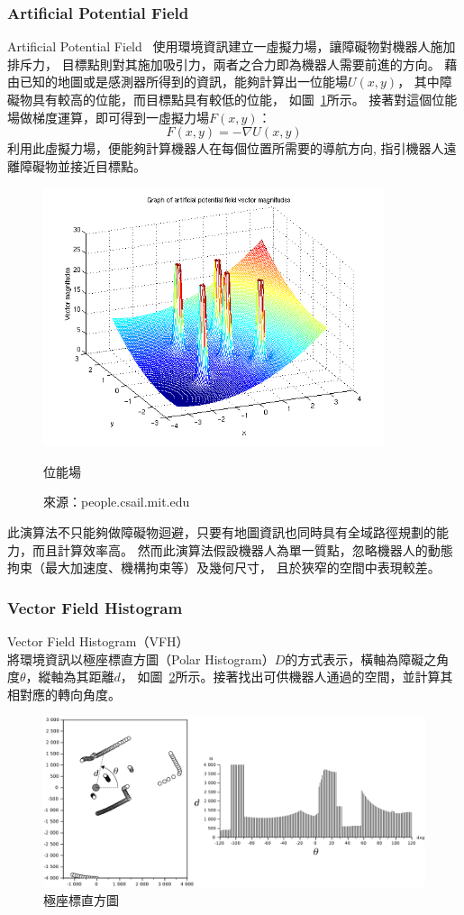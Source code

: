 \subsubsection{Artificial Potential Field}
Artificial Potential Field~\cite{Khatib:1985:APF}
使用環境資訊建立一虛擬力場，讓障礙物對機器人施加排斥力，
目標點則對其施加吸引力，兩者之合力即為機器人需要前進的方向。
藉由已知的地圖或是感測器所得到的資訊，能夠計算出一位能場$U(x,y)$，
其中障礙物具有較高的位能，而目標點具有較低的位能，
如圖~\ref{f:potential_field}所示。
接著對這個位能場做梯度運算，即可得到一虛擬力場$F(x,y)$：
\begin{equation}
	F(x,y) = -\nabla U(x,y)
\end{equation}
利用此虛擬力場，便能夠計算機器人在每個位置所需要的導航方向, 
指引機器人遠離障礙物並接近目標點。
\begin{figure}[h!]
	\centering
	\includegraphics[width=10cm]{figures/demo_apf_whitebg}
	\caption{位能場}
	\caption*{來源：people.csail.mit.edu}
	\label{f:potential_field}
\end{figure}

此演算法不只能夠做障礙物迴避，只要有地圖資訊也同時具有全域路徑規劃的能力，而且計算效率高。
然而此演算法假設機器人為單一質點，忽略機器人的動態拘束（最大加速度、機構拘束等）及幾何尺寸，
且於狹窄的空間中表現較差。

\subsubsection{Vector Field Histogram}
Vector Field Histogram（VFH）~\cite{Borenstein:1991:VFH}
將環境資訊以極座標直方圖（Polar Histogram）$D$的方式表示，橫軸為障礙之角度$\theta$，縱軸為其距離$d$，
如圖~\ref{f:vfh}所示。接著找出可供機器人通過的空間，並計算其相對應的轉向角度。
\begin{figure}[h!]
	\centering
	\includegraphics[width=\textwidth]{figures/VFHTotal.png}
	\caption{極座標直方圖}
	\label{f:vfh}
\end{figure}

